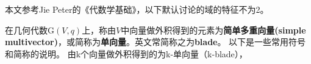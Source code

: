 
本文参考Jie Peter的《代数学基础》，以下默认讨论的域的特征不为2。

\begin{definition}{}
在几何代数$\mathrm G(V,q)$上，称由$V$中向量做外积得到的元素为\textbf{简单多重向量(simple multivector)}，或简称为\textbf{单向量}。英文常简称之为\textbf{blade}。
以下是一些常用符号和简称的说明。
由k个向量做外积得到的为k-单向量（k-blade），
\end{definition}